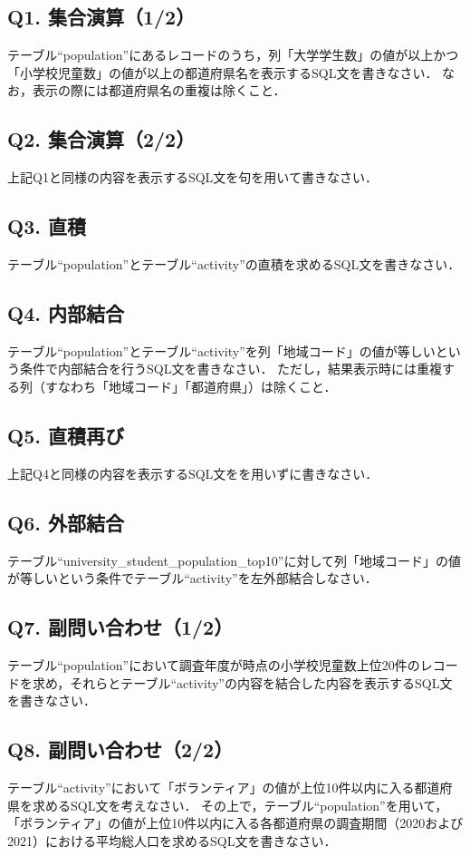 \subsection*{Q1. 集合演算（1/2）}
テーブル``population''にあるレコードのうち，列「大学学生数」の値が以上かつ「小学校児童数」の値が以上の都道府県名を表示するSQL文を書きなさい．
なお，表示の際には都道府県名の重複は除くこと．

\subsection*{Q2. 集合演算（2/2）}
上記Q1と同様の内容を表示するSQL文を句を用いて書きなさい．

\subsection*{Q3. 直積}
テーブル``population''とテーブル``activity''の直積を求めるSQL文を書きなさい．

\subsection*{Q4. 内部結合}
テーブル``population''とテーブル``activity''を列「地域コード」の値が等しいという条件で内部結合を行うSQL文を書きなさい．
ただし，結果表示時には重複する列（すなわち「地域コード」「都道府県」）は除くこと．

\subsection*{Q5. 直積再び}
上記Q4と同様の内容を表示するSQL文をを用いずに書きなさい．

\subsection*{Q6. 外部結合}
テーブル``university\_student\_population\_top10''に対して列「地域コード」の値が等しいという条件でテーブル``activity''を左外部結合しなさい．

\subsection*{Q7. 副問い合わせ（1/2）}
テーブル``population''において調査年度が時点の小学校児童数上位20件のレコードを求め，それらとテーブル``activity''の内容を結合した内容を表示するSQL文を書きなさい．

\subsection*{Q8. 副問い合わせ（2/2）}
テーブル``activity''において「ボランティア」の値が上位10件以内に入る都道府県を求めるSQL文を考えなさい．
その上で，テーブル``population''を用いて，「ボランティア」の値が上位10件以内に入る各都道府県の調査期間（2020および2021）における平均総人口を求めるSQL文を書きなさい．
